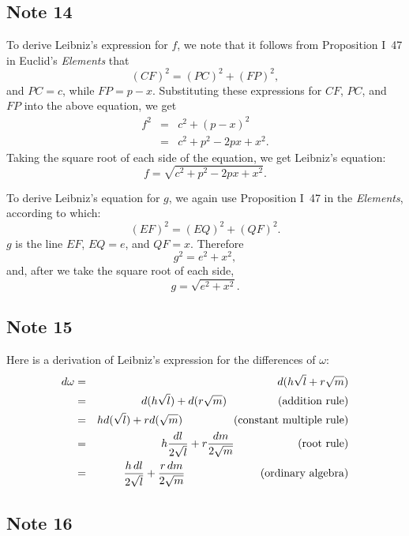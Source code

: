\documentclass[polutonikogreek,english,twoside,openright]{article}
\begin{document}
\subsection*{Note 14}
\label{cnm14}

To derive Leibniz's expression for $f$, we note that it follows from
Proposition I~47 in Euclid's {\em Elements} that
$$(CF)^2 =  (PC)^2 + (FP)^2 ,$$
and $PC= c$, while $FP = p-x$.  Substituting these expressions for
$CF$, $PC$, and $FP$ into the above equation, we get
\begin{eqnarray*}
f^2  & = & c^2 + (p-x)^2 \\
& = &  c^2 + p^2 - 2px + x^2.
\end{eqnarray*}
Taking the square root of each side of the equation, we get Leibniz's equation:
$$f = \sqrt{c^2 + p^2 - 2px + x^2}.$$

To derive Leibniz's equation for $g$, we again use Proposition I~47 in the {\em Elements}, according to which:
$$(EF)^2 = (EQ)^2 + (QF)^2.$$
$g$ is the line $EF$, $EQ = e$, and $QF = x$.  Therefore
$$g^2 = e^2 + x^2,$$
and, after we take the square root of each side,
$$g = \sqrt{e^2 + x^2}.$$

\subsection*{Note 15}
\label{cnm15}

Here is a derivation of Leibniz's expression for the differences of $\omega$:
\begin{eqnarray*}
d\omega & = & d(h\sqrt{l} + r\sqrt{m})\\
& = & d(h\sqrt{l}) + d(r\sqrt{m}) \mbox{\hspace{10ex} (addition rule)}\\
& = & hd(\sqrt{l}) + rd(\sqrt{m})  \mbox{\hspace{10ex} (constant multiple rule)}\\
& = & h\frac{dl}{2\sqrt{l}} + r\frac{dm}{2\sqrt{m}}  \mbox{\hspace{12.6ex} (root rule)}\\
& = & \frac{h\,dl}{2\sqrt{l}} + \frac{r\,dm}{2\sqrt{m}} \mbox{\hspace{15.1ex} (ordinary algebra)}
\end{eqnarray*}

\subsection*{Note 16}
\label{cnm16}
\end{document}
